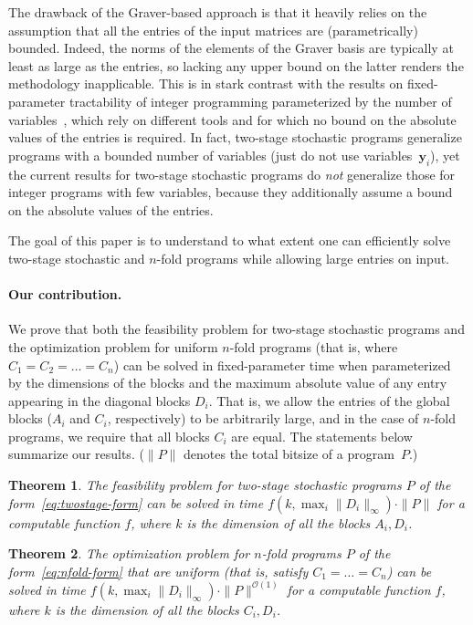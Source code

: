 \documentclass{article}
\newtheorem{theorem}{Theorem}\newtheorem{lemma}[theorem]{Lemma}\newtheorem{proposition}[theorem]{Proposition}\newtheorem{corollary}[theorem]{Corollary}\newtheorem{definition}[theorem]{Definition}\newtheorem{claim}[theorem]{Claim}\newtheorem{remark}[theorem]{Remark}\newtheorem{observation}[theorem]{Observation}\newtheorem{conjecture}[theorem]{Conjecture}\newtheorem{example}[theorem]{Example}
\newcommand{\tup}[1]{{\mathbf{#1}}}
\newcommand{\yy}{\tup y}
\newcommand{\Oh}{{\mathcal{O}}}
\begin{document}
The drawback of the Graver-based approach is that it heavily relies on the assumption that all the entries of the input matrices are (parametrically) bounded. Indeed, the norms of the elements of the Graver basis are typically at least as large as the entries, so lacking any upper bound on the latter renders the methodology inapplicable. This is in stark contrast with the results on fixed-parameter tractability of integer programming parameterized by the number of variables~\cite{Dadush12,DadushER23,FrankTardos1987,kannan1987minkowski,Lenstra1983,ReisR23}, which rely on different tools and for which no bound on the absolute values of the entries is required. In fact, two-stage stochastic programs generalize programs with a bounded number of variables (just do not use variables~$\yy_i$), yet the current results for two-stage stochastic programs do {\em{not}} generalize those for integer programs with few variables, because they additionally assume a bound on the absolute values of the entries.

The goal of this paper is to understand to what extent one can efficiently solve two-stage stochastic and $n$-fold programs
while allowing large entries on input.

\paragraph*{Our contribution.} We prove that both the feasibility problem for two-stage stochastic programs and the optimization problem for uniform $n$-fold programs (that is, where $C_1=C_2=\ldots=C_n$) can be solved in fixed-parameter time when parameterized by the dimensions of the blocks and the maximum absolute value of any entry appearing in the diagonal blocks $D_i$. That is, we allow the entries of the global blocks ($A_i$ and $C_i$, respectively) to be arbitrarily large, and in the case of $n$-fold programs, we require that all blocks $C_i$ are equal. The statements below summarize our results. ($\|P\|$ denotes the total bitsize of a program~$P$.)

\begin{theorem}\label{thm:2stage-intro}
   The feasibility problem for two-stage stochastic programs $P$ of the form~\cref{eq:twostage-form} can be solved in time $f(k,\max_i \|D_i\|_\infty)\cdot \|P\|$ for a computable function $f$, where $k$ is the dimension of all the blocks $A_i,D_i$.
\end{theorem}

\begin{theorem}\label{thm:nfold-intro}
    The optimization problem for $n$-fold programs $P$ of the form~\cref{eq:nfold-form} that are uniform (that is, satisfy $C_1=\ldots=C_n$) can be solved in time $f(k,\max_i \|D_i\|_\infty)\cdot \|P\|^{\Oh(1)}$ for a computable function $f$, where $k$ is the dimension of all the blocks $C_i,D_i$.
\end{theorem}
\end{document}
